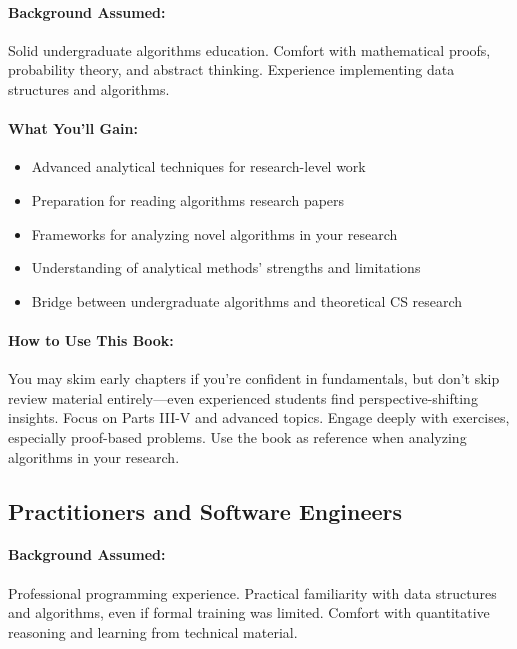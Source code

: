 \paragraph{Background Assumed:}
Solid undergraduate algorithms education. Comfort with mathematical proofs, probability theory, and abstract thinking. Experience implementing data structures and algorithms.

\paragraph{What You'll Gain:}
\begin{itemize}
    \item Advanced analytical techniques for research-level work
    \item Preparation for reading algorithms research papers
    \item Frameworks for analyzing novel algorithms in your research
    \item Understanding of analytical methods' strengths and limitations
    \item Bridge between undergraduate algorithms and theoretical CS research
\end{itemize}

\paragraph{How to Use This Book:}
You may skim early chapters if you're confident in fundamentals, but don't skip review material entirely—even experienced students find perspective-shifting insights. Focus on Parts III-V and advanced topics. Engage deeply with exercises, especially proof-based problems. Use the book as reference when analyzing algorithms in your research.

\subsection{Practitioners and Software Engineers}

\paragraph{Background Assumed:}
Professional programming experience. Practical familiarity with data structures and algorithms, even if formal training was limited. Comfort with quantitative reasoning and learning from technical material.

